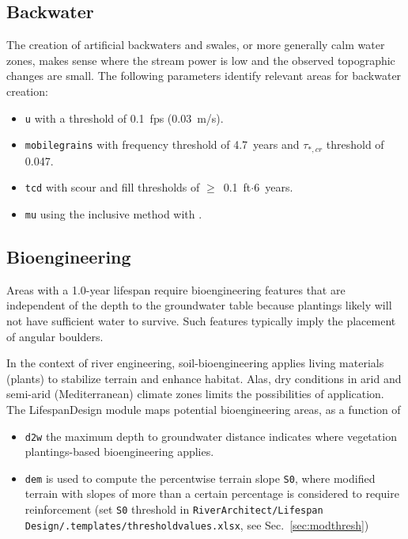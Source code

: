 \subsection{Backwater}\label{sec:backwtr}
The creation of artificial backwaters and swales, or more generally calm water zones, makes sense where the stream power is low and the observed topographic changes are small. The following parameters identify relevant areas for backwater creation:
\begin{itemize}
	\item \texttt{u} with a threshold of 0.1~fps (0.03~m/s).
	\item \texttt{mobile{\myUnderscore}grains} with frequency threshold of 4.7~years and $\tau_{*,cr}$ threshold of 0.047.
	\item \texttt{tcd} with scour and fill thresholds of $\geq$~0.1~ft$\cdot$6~years.
	\item \texttt{mu} using the inclusive method with .
\end{itemize}

\subsection{Bioengineering}\label{sec:bioeng}

Areas with a 1.0-year lifespan require bioengineering features that are independent of the depth to the groundwater table because plantings likely will not have sufficient water to survive. Such features typically imply the placement of angular boulders.

In the context of river engineering, soil-bioengineering applies living materials (plants) to stabilize terrain and enhance habitat. Alas, dry conditions in arid and semi-arid (Mediterranean) climate zones limits the possibilities of application. The LifespanDesign module maps potential bioengineering areas, as a function of
\begin{itemize}
	\item \texttt{d2w} the maximum depth to groundwater distance indicates where vegetation plantings-based bioengineering applies.
	\item \texttt{dem} is used to compute the percentwise terrain slope \texttt{S0}, where modified terrain with slopes of more than a certain percentage is considered to require reinforcement (set \texttt{S0} threshold in \texttt{RiverArchitect/Lifespan Design/.templates/threshold{\myUnderscore}values.xlsx}, see Sec.~\ref{sec:modthresh})
\end{itemize}

